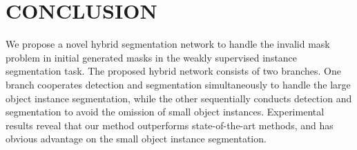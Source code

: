 \documentclass{article}
\begin{document}
%
%
%


\section{CONCLUSION}
\label{sec:conclusion}
We propose a novel hybrid segmentation network to handle the invalid mask problem in initial generated masks in the weakly supervised instance segmentation task.
The proposed hybrid network consists of two branches.
One branch cooperates detection and segmentation simultaneously to handle the large object instance segmentation, while the other sequentially conducts detection and segmentation to avoid the omission of small object instances.
Experimental results reveal that our method outperforms state-of-the-art methods, and has obvious advantage on the small object instance segmentation.

\vfill\pagebreak


%

\end{document}
